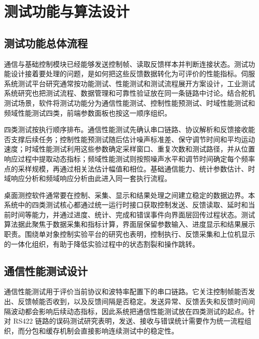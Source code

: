 \chapter{测试功能与算法设计}

\section{测试功能总体流程}

通信与基础控制模块已经能够发送控制帧、读取反馈样本并判断连接状态。测试功能设计接着要处理的问题，是如何把这些反馈数据转化为可评价的性能指标。伺服系统测试平台研究通常按功能测试、性能测试和测试流程展开方案设计，工业测试系统研究也把测试流程、数据管理和可靠性验证放在同一条链路中讨论\cite{li2014servotest,xu2021industry4test,liu2022industrialsoftware}。结合舵机测试场景，软件将测试功能分为通信性能测试、控制性能预测试、时域性能测试和频域性能测试四类，前端参数面板也按这一顺序组织。

四类测试按执行顺序排布。通信性能测试先确认串口链路、协议解析和反馈接收能否支撑后续任务；控制性能预测试随后估计噪声标准差、保守调节时间和平均运动速度；时域性能测试利用这些参数确定采样窗口、重复次数和测试路径，并从位置响应过程中提取动态指标；频域性能测试则按照噪声水平和调节时间确定每个频率点的采样规模，再通过相关法估计幅值和相位。基础通信能力、统计参数估计、时域响应分析和频域响应分析由此进入同一套执行流程。

桌面测控软件通常要在控制、采集、显示和结果处理之间建立稳定的数据边界\cite{zhang2017qtflowmeter,li2014servotest}。本系统中的四类测试核心都通过统一运行时接口获取控制发送、反馈读取、延时和当前时间等能力，并通过进度、统计、完成和错误事件向界面层回传过程状态。测试算法据此聚焦于数据采集和指标计算，界面层保留参数输入、进度显示和结果展示职责。围绕单对象控制实验平台的研究也表明，控制执行、反馈采集和上位机显示的一体化组织，有助于降低实验过程中的状态割裂和操作跳转\cite{lin2025dtcplatform,zhou2020pmsmexperiment,zhang2016bldcexperiment}。

\section{通信性能测试设计}

通信性能测试用于评价当前协议和波特率配置下的串口链路。它关注控制帧能否发出、反馈帧能否收到，以及反馈间隔是否稳定。发送异常、反馈丢失和反馈时间间隔波动都会影响后续动态指标，因此系统把通信性能测试放在四类测试的起点。针对 RS422 链路的误码测试研究表明，发送、接收与错误统计需要作为统一流程组织，而分包和缓存机制会直接影响连续测试中的稳定性\cite{hu2026rs422ber,wu2025serialpacket}。

